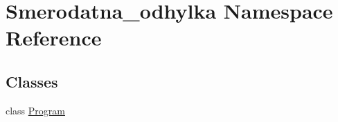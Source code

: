 \hypertarget{namespace_smerodatna__odhylka}{}\section{Smerodatna\+\_\+odhylka Namespace Reference}
\label{namespace_smerodatna__odhylka}
\subsection*{Classes}
\begin{DoxyCompactItemize}
\item 
class \mbox{\hyperlink{class_smerodatna__odhylka_1_1_program}{Program}}
\end{DoxyCompactItemize}
